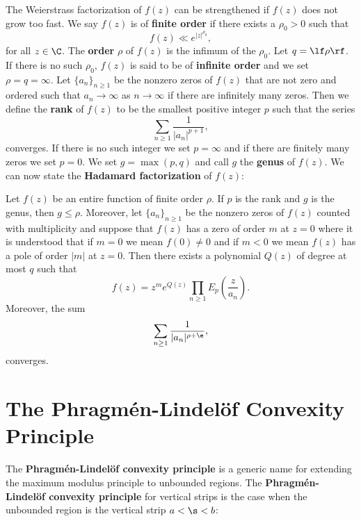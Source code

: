     The Weierstrass factorization of $f(z)$ can be strengthened if $f(z)$ does not grow too fast. We say $f(z)$ is of \textbf{finite order} if there exists a $\rho_{0} > 0$ such that
    \[
      f(z) \ll e^{|z|^{\rho_{0}}},
    \]
    for all $z \in \C$. The \textbf{order} $\rho$ of $f(z)$ is the infimum of the $\rho_{0}$. Let $q = \lf \rho \rf$. If there is no such $\rho_{0}$, $f(z)$ is said to be of \textbf{infinite order} and we set $\rho = q = \infty$. Let $\{a_{n}\}_{n \ge 1}$ be the nonzero zeros of $f(z)$ that are not zero and ordered such that $a_{n} \to \infty$ as $n \to \infty$ if there are infinitely many zeros. Then we define the \textbf{rank} of $f(z)$ to be the smallest positive integer $p$ such that the series
    \[
      \sum_{n \ge 1}\frac{1}{|a_{n}|^{p+1}},
    \]
    converges. If there is no such integer we set $p = \infty$ and if there are finitely many zeros we set $p = 0$. We set $g = \max(p,q)$ and call $g$ the \textbf{genus} of $f(z)$. We can now state the \textbf{Hadamard factorization} of $f(z)$:

    \begin{theorem}
      Let $f(z)$ be an entire function of finite order $\rho$. If $p$ is the rank and $g$ is the genus, then $g \le \rho$. Moreover, let $\{a_{n}\}_{n \ge 1}$ be the nonzero zeros of $f(z)$ counted with multiplicity and suppose that $f(z)$ has a zero of order $m$ at $z = 0$ where it is understood that if $m = 0$ we mean $f(0) \neq 0$ and if $m < 0$ we mean $f(z)$ has a pole of order $|m|$ at $z = 0$. Then there exists a polynomial $Q(z)$ of degree at most $q$ such that
      \[
        f(z) = z^{m}e^{Q(z)}\prod_{n \ge 1}E_{p}\left(\frac{z}{a_{n}}\right).
      \]
      Moreover, the sum
      \[
        \sum_{n \ge 1}\frac{1}{|a_{n}|^{\rho+\e}},
      \]
      converges.
    \end{theorem}
  \section{The Phragm\'en-Lindel\"of Convexity Principle}\label{append:The_Phragmen_Lindelof_Convexity_principle}
    The \textbf{Phragm\'en-Lindel\"of convexity principle} is a generic name for extending the maximum modulus principle to unbounded regions. The \textbf{Phragm\'en-Lindel\"of convexity principle} for vertical strips is the case when the unbounded region is the vertical strip $a < \s < b$:

